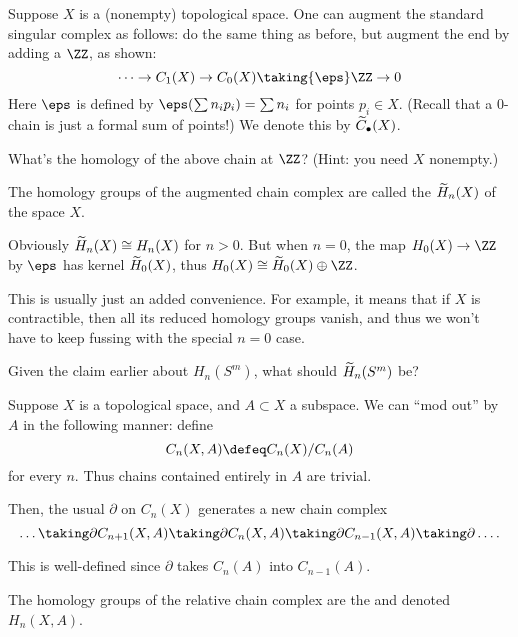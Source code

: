 \begin{example}
	Suppose $X$ is a (nonempty) topological space.
	One can augment the standard singular complex as follows:
	do the same thing as before, but augment the end by adding a $\ZZ$,
	as shown:
	\[ \dots \to C_1(X) \to C_0(X) \taking{\eps} \ZZ \to 0 \]
	Here $\eps$ is defined by $\eps(\sum n_ip_i) = \sum n_i$ for points $p_i \in X$.
	(Recall that a $0$-chain is just a formal sum of points!)
	We denote this  by $\widetilde C_\bullet(X)$.
\end{example}
\begin{ques}
	What's the homology of the above chain at $\ZZ$?
	(Hint: you need $X$ nonempty.)
\end{ques}
\begin{definition}
	\label{def:augment}
	The homology groups of the augmented chain complex are called the
	 $\widetilde H_n(X)$ of the space $X$.

	Obviously $\widetilde H_n(X) \cong H_n(X)$ for $n > 0$.
	But when $n=0$, the map $H_0(X) \to \ZZ$ by $\eps$ has kernel $\widetilde H_0(X)$,
	thus $H_0(X) \cong \wt H_0(X) \oplus \ZZ$.
\end{definition}
This is usually just an added convenience.
For example, it means that if $X$ is contractible,
then all its reduced homology groups vanish,
and thus we won't have to keep fussing with the special $n=0$ case.
\begin{ques}
	Given the claim earlier about $H_n(S^m)$, what should $\widetilde H_n(S^m)$ be?
\end{ques}

\begin{example}
	Suppose $X$ is a topological space, and $A \subset X$ a subspace.
	We can ``mod out'' by $A$ in the following manner: define
	\[ C_n(X,A) \defeq C_n(X) / C_n(A) \]
	for every $n$. Thus chains contained entirely in $A$ are trivial.

	Then, the usual $\partial$ on $C_n(X)$ generates a new chain complex
	\[ \dots \taking\partial C_{n+1}(X,A) \taking\partial C_n(X,A)
	\taking\partial C_{n-1}(X,A) \taking\partial \dots. \]

	This is well-defined since $\partial$ takes $C_n(A)$ into $C_{n-1}(A)$.
\end{example}
\begin{definition}
	The homology groups of the relative chain complex are the
	 and denoted $H_n(X,A)$.
\end{definition}

